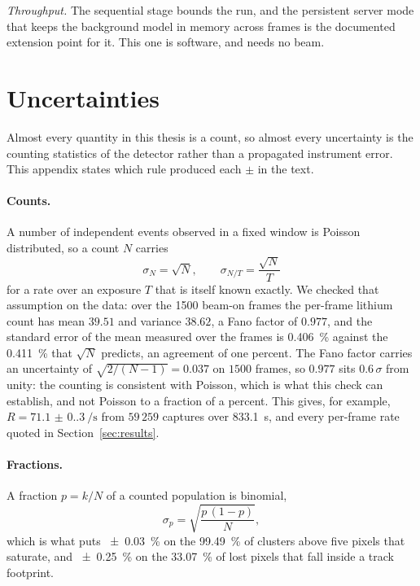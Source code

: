 \documentclass[a4paper,headsepline,oneside,11pt]{scrartcl}
\begin{document}
\emph{Throughput.} The sequential stage bounds the run, and the persistent
server mode that keeps the background model in memory across frames is the
documented extension point for it. This one is software, and needs no beam.

\FloatBarrier
\clearpage

\appendix
\section{Uncertainties}
\label{app:uncertainties}

Almost every quantity in this thesis is a count, so almost every uncertainty is
the counting statistics of the detector rather than a propagated instrument
error. This appendix states which rule produced each $\pm$ in the text.

\paragraph{Counts.} A number of independent events observed in a fixed window is
Poisson distributed, so a count $N$ carries
%
\begin{equation}
  \sigma_N = \sqrt{N},
  \qquad
  \sigma_{N/T} = \frac{\sqrt{N}}{T}
  \label{eq:poisson}
\end{equation}
%
for a rate over an exposure $T$ that is itself known exactly. We checked that assumption
on the data: over the 1500
beam-on frames the per-frame lithium count has mean $39.51$ and variance $38.62$,
a Fano factor of $0.977$, and the standard error of the mean measured over the
frames is \SI{0.406}{\percent} against the \SI{0.411}{\percent} that $\sqrt{N}$ predicts, an
agreement of one percent. The Fano factor carries an uncertainty of
$\sqrt{2/(N-1)} = 0.037$ on $1500$ frames, so $0.977$ sits $0.6\,\sigma$ from
unity: the counting is consistent with Poisson, which is what this check can
establish, and not Poisson to a fraction of a percent. This gives, for
example, $R = \SI[per-mode=reciprocal]{71.1(0.3)}{\per\second}$ from $59\,259$ captures over
\SI{833.1}{\second}, and every per-frame rate quoted in Section~\ref{sec:results}.

\paragraph{Fractions.} A fraction $p = k/N$ of a counted population is binomial,
%
\begin{equation}
  \sigma_p = \sqrt{\frac{p\,(1-p)}{N}},
  \label{eq:binomial}
\end{equation}
%
which is what puts \SI{\pm0.03}{\percent} on the \SI{99.49}{\percent} of clusters above five
pixels that saturate, and \SI{\pm0.25}{\percent} on the \SI{33.07}{\percent} of lost pixels that
fall inside a track footprint.
\end{document}
